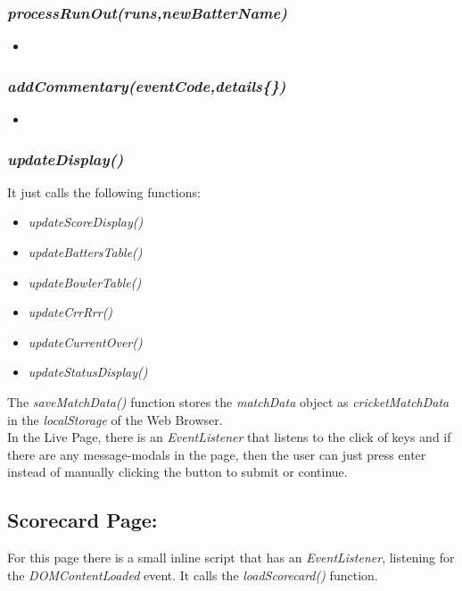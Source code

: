 \documentclass[a4paper,12pt]{article}
\begin{document}
\subsubsection{\textit{processRunOut(runs,newBatterName)}}
\begin{itemize}
\item 
\end{itemize}

\subsubsection{\textit{addCommentary(eventCode,details\{\})}}
\begin{itemize}
\item 
\end{itemize}


\subsubsection{\textit{updateDisplay()}}
It just calls the following functions:
\begin{itemize}
\item \textit{updateScoreDisplay()} 
\item \textit{updateBattersTable()}
\item \textit{updateBowlerTable()}
\item \textit{updateCrrRrr()}
\item \textit{updateCurrentOver()}
\item \textit{updateStatusDisplay()}
\end{itemize}

\hspace{0.5cm}

The \textit {saveMatchData()} function stores the \textit {matchData} object as \textit {cricketMatchData} in the \textit {localStorage} of the Web Browser. \\

In the Live Page, there is an \textit{EventListener} that listens to the click of keys and if there are any message-modals in the page, then the user can just press enter instead of manually clicking the button to submit or continue. 
\subsection{Scorecard Page:}
For this page there is a small inline script that has an \textit{EventListener}, listening for the \textit{DOMContentLoaded} event.
It calls the \textit{loadScorecard()} function.
\end{document}
